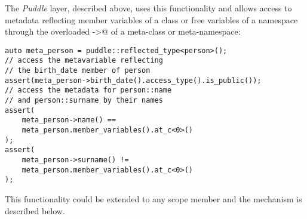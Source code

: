 The {\em Puddle} layer, described above, uses this functionality and allows
access to metadata reflecting member variables of a class or free variables
of a namespace through the overloaded \verb@operator ->@ of a meta-class
or meta-namespace:

\begin{lstlisting}
auto meta_person = puddle::reflected_type<person>();
// access the metavariable reflecting
// the birth_date member of person
assert(meta_person->birth_date().access_type().is_public());
// access the metadata for person::name
// and person::surname by their names
assert(
	meta_person->name() ==
	meta_person.member_variables().at_c<0>()
);
assert(
	meta_person->surname() !=
	meta_person.member_variables().at_c<0>()
);

\end{lstlisting}

This functionality could be extended to any scope member and
the mechanism is described below.

